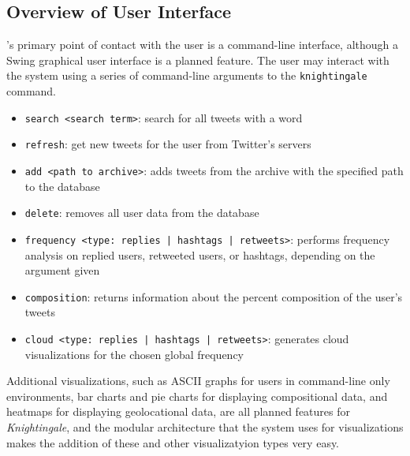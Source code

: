 \documentclass[a4paper, 12pt]{article}
\begin{document}
\subsection{Overview of User Interface} \label{sec:ui}
\begin{adjustwidth}{2em}{0pt}
's primary point of contact with the user is a command-line interface, although a Swing graphical user interface is a planned feature. The user may interact with the system using a series of command-line arguments to the \texttt{knightingale} command.
\begin{itemize}
\item \texttt{search <search term>}: search for all tweets with a word
\item \texttt{refresh}: get new tweets for the user from Twitter's servers
\item \texttt{add <path to archive>}: adds tweets from the archive with the specified path to the database
\item \texttt{delete}: removes all user data from the database
\item \texttt{frequency <type: replies | hashtags | retweets>}: performs frequency analysis on replied users, retweeted users, or hashtags, depending on the argument given
\item \texttt{composition}: returns information about the percent composition of the user's tweets
\item \texttt{cloud <type: replies | hashtags | retweets>}: generates cloud visualizations for the chosen global frequency
\end{itemize}
Additional visualizations, such as ASCII graphs for users in command-line only environments, bar charts and pie charts for displaying compositional data, and heatmaps for displaying geolocational data, are all planned features for \textit{Knightingale}, and the modular architecture that the system uses for visualizations makes the addition of these and other visualizatyion types very easy.
\end{adjustwidth}
\end{document}
